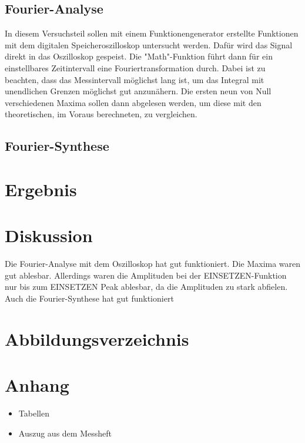 \documentclass[11pt,ngerman,a4paper]{article}
\begin{document}
\subsection{Fourier-Analyse}
In diesem Versuchsteil sollen mit einem Funktionengenerator erstellte Funktionen mit dem digitalen Speicheroszilloskop untersucht werden. Dafür wird das Signal direkt in das Oszilloskop gespeist. Die "Math"-Funktion führt dann für ein einstellbares Zeitintervall eine Fouriertransformation durch. Dabei ist zu beachten, dass das Messintervall möglichst lang ist, um das Integral mit unendlichen Grenzen möglichst gut anzunähern. Die ersten neun von Null verschiedenen Maxima sollen dann abgelesen werden, um diese mit den theoretischen, im Voraus berechneten, zu vergleichen.
\subsection{Fourier-Synthese}
\section{Ergebnis}
\section{Diskussion}
Die Fourier-Analyse mit dem Oszilloskop hat gut funktioniert. Die Maxima waren gut ablesbar. Allerdings waren die Amplituden bei der EINSETZEN-Funktion nur bis zum EINSETZEN Peak ablesbar, da die Amplituden zu stark abfielen. Auch die Fourier-Synthese hat gut funktioniert
\section{Abbildungsverzeichnis}
\section{Anhang}
\begin{itemize}
\item Tabellen
\item Auszug aus dem Messheft
\end{itemize}

\newpage
\end{document}
